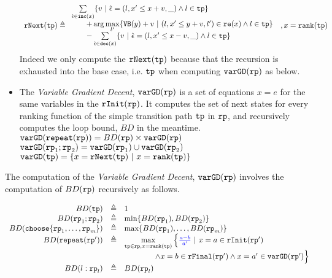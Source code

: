 \begin{defn}
\begin{itemize}
\[\begin{array}{l}
   \rfnext(\tpath) \triangleq 
     \begin{array}{l}
  \sum\limits_{\absevent \in \inc(x) }
   \left\{ v ~\middle\vert~ \absevent = (l, x' \leq x + v, \_) \land l \in \tpath\right\}
   \\ \qquad 
   + \arg\max\limits_{l' }
      \left\{ \varinvar(y) + v ~\middle\vert~ (l, x' \leq y + v, l') \in \reset(x) \land l \in \tpath\right\}
      \\ \qquad 
     - \sum\limits_{ \absevent \in \dec(x) }\left\{ 
       v ~\middle\vert~ \absevent = (l, x' \leq x - v, \_) \land l \in \tpath 
       \right\}
     \end{array}
   \end{array}
   , x = \locbound(\tpath)
 \]
 Indeed we only compute the $\mathtt{rNext}(\mathtt{tp})$ because that the recursion is exhausted into the base case, i.e. $\mathtt{tp}$ when computing $\mathtt{varGD}(\mathtt{rp})$ as below.
 \item  The \emph{Variable Gradient Decent}, 
 $\mathtt{varGD}(\mathtt{rp})$
 is a set of equations $x = e$ for the same variables in the $\mathtt{rInit}(\mathtt{rp})$.
 It computes the set of next states for every ranking function of the simple transition path $\mathtt{tp}$ in $\mathtt{rp}$,
 and recursively computes the loop bound, $BD$ in the meantime.
 \\
 {$\mathtt{varGD}(\mathtt{repeat}(\mathtt{rp})) =  BD(\mathtt{rp})  \times
{\ensuremath{\mathtt{varGD}}(\ensuremath{\mathtt{rp}})}$}
 \\
 $\mathtt{varGD}(\mathtt{rp}_1;\mathtt{rp}_2) =  \mathtt{varGD}(\mathtt{rp}_1) \cup \mathtt{varGD}(\mathtt{rp}_2)$
 \\
 $\varGD(\tpath) =  \left\{x = \rfnext(\tpath) ~|~ x = \locbound(\tpath) \right\} $  
\end{itemize}
\end{defn}
The computation of the \emph{Variable Gradient Decent}, 
$\mathtt{varGD}(\mathtt{rp})$ involves the computation of $BD(\mathtt{rp})$ recursively as follows.
\begin{defn}
\label{def:loopbound}
  \[
    \begin{array}{rcl}
      BD(\tpath) & \triangleq & 1 \\
      BD(\rprog_1;\rprog_2) & \triangleq & \min \left\{BD(\rprog_1), BD(\rprog_2) \right\} \\
      BD(\rpchoose{\rprog_1, \ldots, \rprog_m }) & \triangleq 
      & \max\left\{ BD(\rprog_1), \ldots, BD(\rprog_m) \right\} \\
      BD(\rprepeat(\rprog')) & \triangleq 
      &
      \max\limits_{\tpath \in \rprog, x = \locbound(\tpath)}
      \Big\{ \highlight{\frac{a - b}{a'}} ~\vert~
      x = a \in \rfinit(\rprog')
      \\ & & \qquad \qquad
      \land x = b \in \rffinal(\rprog')
      \land x = a' \in \varGD(\rprog')
      \Big\} 
      \\
      BD(l: \rprog_l) & \triangleq & BD(\rprog_l)
    \end{array}
  \]
\end{defn}
